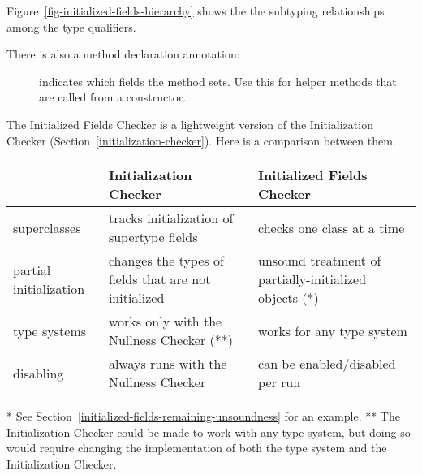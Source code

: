 Figure~\ref{fig-initialized-fields-hierarchy} shows the the subtyping
relationships among the type qualifiers.


There is also a method declaration annotation:

\begin{description}
\item[]
  indicates which fields the method sets.  Use this for helper methods that
  are called from a constructor.
\end{description}



The Initialized Fields Checker is a lightweight version of the  Initialization Checker
(Section~\ref{initialization-checker}).  Here is a comparison between them.

\noindent
\begin{small}
\begin{tabular}{| l | l | l |}
 \hline
 & Initialization Checker & Initialized Fields Checker
 \\ \hline
 superclasses
 & tracks initialization of supertype fields
 & checks one class at a time
 \\
 partial initialization
 & changes the types of fields that are not initialized
 & unsound treatment of partially-initialized objects (*)
 \\
 type systems
 & works only with the Nullness Checker (**)
 & works for any type system
 \\
 disabling
 & always runs with the Nullness Checker
 & can be enabled/disabled per run
 \\
 \hline
\end{tabular}

\noindent
* See Section~\ref{initialized-fields-remaining-unsoundness} for an example.
\newline
** The Initialization Checker could be made to work with any type system, but
doing so would require changing the implementation of both the type system and
the Initialization Checker.
\end{small}


